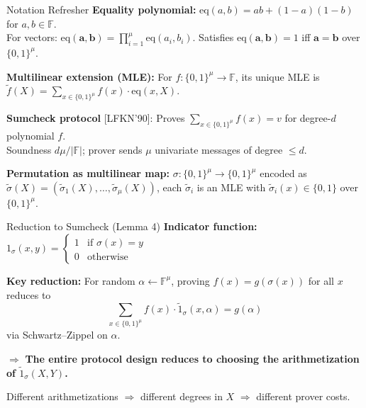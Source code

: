 \documentclass[aspectratio=169,10pt]{beamer}
\newcommand{\F}{\mathbb{F}}
\newcommand{\B}{\{0,1\}}
\newcommand{\eq}{\mathrm{eq}}
\newcommand{\wt}[1]{\widetilde{#1}}
\begin{document}

\begin{frame}{Notation Refresher}
\textbf{Equality polynomial:}
$\eq(a, b) = ab + (1-a)(1-b)$ for $a,b \in \F$.\\
For vectors: $\eq(\mathbf{a}, \mathbf{b}) = \prod_{i=1}^{\mu} \eq(a_i, b_i)$.
Satisfies $\eq(\mathbf{a}, \mathbf{b}) = 1$ iff $\mathbf{a} = \mathbf{b}$ over $\B^\mu$.

\vspace{0.6em}
\textbf{Multilinear extension (MLE):}
For $f : \B^\mu \to \F$, its unique MLE is
$\wt{f}(X) = \sum_{x \in \B^\mu} f(x) \cdot \eq(x, X)$.

\vspace{0.6em}
\textbf{Sumcheck protocol} \textup{[LFKN'90]}:
Proves $\sum_{x \in \B^\mu} f(x) = v$ for degree-$d$ polynomial $f$.\\
Soundness $d\mu / |\F|$; prover sends $\mu$ univariate messages of degree $\le d$.

\vspace{0.6em}
\textbf{Permutation as multilinear map:}
$\sigma : \B^\mu \to \B^\mu$ encoded as $\wt{\sigma}(X) = (\wt{\sigma}_1(X), \ldots, \wt{\sigma}_\mu(X))$, each $\wt{\sigma}_i$ is an MLE with $\wt{\sigma}_i(x) \in \{0,1\}$ over $\B^\mu$.
\end{frame}

\begin{frame}{Reduction to Sumcheck (Lemma 4)}
\textbf{Indicator function:} $1_\sigma(x,y) = \begin{cases} 1 & \text{if } \sigma(x) = y \\ 0 & \text{otherwise} \end{cases}$

\vspace{0.6em}
\textbf{Key reduction:} For random $\alpha \leftarrow \F^\mu$, proving $f(x) = g(\sigma(x))$ for all $x$ reduces to
\[
  \boxed{\sum_{x \in \B^\mu} f(x) \cdot \wt{1}_\sigma(x, \alpha) = g(\alpha)}
\]
via Schwartz--Zippel on $\alpha$.

\vspace{0.8em}
$\Rightarrow$ \textbf{The entire protocol design reduces to choosing the arithmetization of $\wt{1}_\sigma(X, Y)$.}

\vspace{0.4em}
Different arithmetizations $\Rightarrow$ different degrees in $X$ $\Rightarrow$ different prover costs.
\end{frame}
\end{document}
